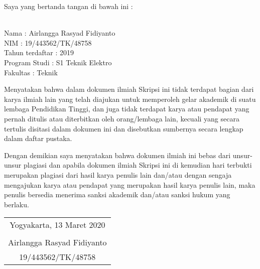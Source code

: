 \noindent Saya yang bertanda tangan di bawah ini :

\vspace{-1em}

\begin{tabbing}
\hspace{40mm} \= \\ %
\noindent Nama \> : Airlangga Rasyad Fidiyanto \\[\parskip]
\noindent NIM \> : 19/443562/TK/48758 \\[\parskip]
\noindent Tahun terdaftar \> : 2019 \\[\parskip]
\noindent Program Studi \> : S1 Teknik Elektro \\[\parskip]
\noindent Fakultas \> : Teknik
\end{tabbing}

\noindent Menyatakan bahwa dalam dokumen ilmiah Skripsi ini tidak terdapat bagian dari karya ilmiah lain yang telah diajukan untuk memperoleh gelar akademik di suatu lembaga Pendidikan Tinggi, dan juga tidak terdapat karya atau pendapat yang pernah ditulis atau diterbitkan oleh orang/lembaga lain, kecuali yang secara tertulis disitasi dalam dokumen ini dan disebutkan sumbernya secara lengkap dalam daftar pustaka.

\noindent Dengan demikian saya menyatakan bahwa dokumen ilmiah ini bebas dari unsur-unsur plagiasi dan apabila dokumen ilmiah Skripsi ini di kemudian hari terbukti merupakan plagiasi dari hasil karya penulis lain dan/atau dengan sengaja mengajukan karya atau pendapat yang merupakan hasil karya penulis lain, maka penulis bersedia menerima sanksi akademik dan/atau sanksi hukum yang berlaku.


\begin{flushright}
	\begin{tabular}{c}
		Yogyakarta, 13 Maret 2020 \\
		\vspace{2.5cm} \\
		Airlangga Rasyad Fidiyanto \\ 19/443562/TK/48758
	\end{tabular}
\end{flushright}